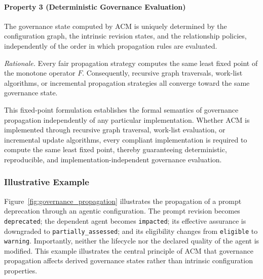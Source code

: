 \documentclass[10pt]{article}
\begin{document}

\paragraph{Property 3 (Deterministic Governance Evaluation)}

The governance state computed by ACM is uniquely determined by the
configuration graph, the intrinsic revision states, and the relationship
policies, independently of the order in which propagation rules are evaluated.

\emph{Rationale.}
Every fair propagation strategy computes the same least fixed point of the
monotone operator $F$. Consequently, recursive graph traversals, work-list
algorithms, or incremental propagation strategies all converge toward the same
governance state.


This fixed-point formulation establishes the formal semantics of governance
propagation independently of any particular implementation. Whether ACM is
implemented through recursive graph traversal, work-list evaluation, or
incremental update algorithms, every compliant implementation is required to
compute the same least fixed point, thereby guaranteeing deterministic,
reproducible, and implementation-independent governance evaluation.
\subsubsection{Illustrative Example}

Figure~\ref{fig:governance_propagation} illustrates the propagation of a prompt
deprecation through an agentic configuration. The prompt revision becomes
\texttt{deprecated}; the dependent agent becomes \texttt{impacted}; its
effective assurance is downgraded to
\texttt{partially\_assessed}; and its eligibility changes from
\texttt{eligible} to
\texttt{warning}. Importantly, neither the lifecycle nor the declared quality
of the agent is modified. This example illustrates the central principle of ACM
that governance propagation affects derived governance states rather than
intrinsic configuration properties.
\end{document}
